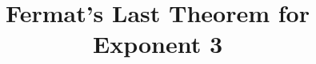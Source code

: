\documentclass{report}
\title{Fermat's Last Theorem for Exponent 3}
\begin{document}
\maketitle


\nocite{*}
\printbibliography
\end{document}

